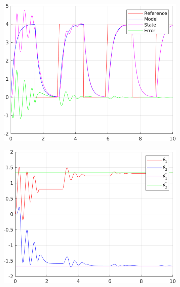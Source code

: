 \documentclass[12pt,a4paper]{article}
\begin{document}
		\begin{figure}[H]
			\centering
			\begin{subfigure}{.45\textwidth}
				\centering
				\includegraphics[width=1\textwidth]{Graphics/LinearState4.png}
			\end{subfigure}%
			\begin{subfigure}{.45\textwidth}
				\centering
				\includegraphics[width=1\textwidth]{Graphics/LinearParameters4.png}
			\end{subfigure}
			\begin{subfigure}{.45\textwidth}
				\centering

\end{subfigure}
\end{figure}
\end{document}
